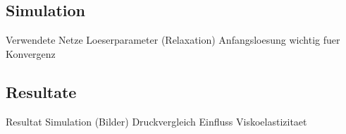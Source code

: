 \subsection{Simulation}
\begin{todocontent}
    \1 Verwendete Netze
    \1 Loeserparameter (Relaxation)
    \1 Anfangsloesung wichtig fuer Konvergenz
\end{todocontent}
%
\subsection{Resultate}
\begin{todocontent}
    \1 Resultat Simulation (Bilder)
    \1 Druckvergleich
    \1 Einfluss Viskoelastizitaet
\end{todocontent}
